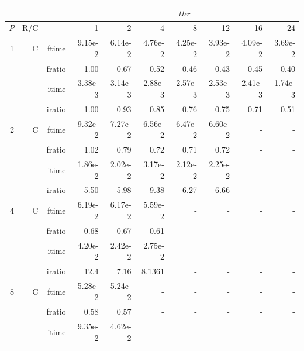 \documentclass[a4paper]{article}
\begin{document}
\begin{table}[htbp]
\begin{center}
\begin{small}
\begin{tabular}{|r|r|r|r|r|r|r|r|r|r|}
\hline 
     & & & \multicolumn{7}{c|}{$thr$} \\ \hline
    $P$ & R/C &  & 1           & 2    & 4    & 8    & 12   & 16    & 24  \\ \hline\hline

   1 &   C &   ftime &    9.15e-2 &    6.14e-2 &    4.76e-2 &    4.25e-2 &    3.93e-2 &    4.09e-2 &    3.69e-2 \\
            &            &  fratio &    1.00 &    0.67 &    0.52 &    0.46 &    0.43 &    0.45 &    0.40 \\
            &            &  itime &    3.38e-3 &    3.14e-3 &    2.88e-3 &    2.57e-3 &    2.53e-3 &    2.41e-3 &    1.74e-3 \\
            &            &  iratio &    1.00 &    0.93 &    0.85 &    0.76 &    0.75 &    0.71 &    0.51 \\\hline
   2 &   C &   ftime &    9.32e-2 &    7.27e-2 &    6.56e-2 &    6.47e-2 &    6.60e-2 &   - &   - \\
            &            &  fratio &    1.02 &    0.79 &    0.72 &    0.71 &    0.72 &   - &   - \\
            &            &  itime &    1.86e-2 &    2.02e-2 &    3.17e-2 &    2.12e-2 &    2.25e-2 &   - &   - \\
            &            &  iratio &    5.50 &    5.98 &    9.38 &    6.27 &    6.66 &   - &   - \\\hline
   4 &   C &   ftime &    6.19e-2 &    6.17e-2 &    5.59e-2 &   - &   - &   - &   - \\
            &            &  fratio &    0.68 &    0.67 &    0.61 &   - &   - &   - &   - \\
            &            &  itime &    4.20e-2 &    2.42e-2 &    2.75e-2 &   - &   - &   - &   - \\
            &            &  iratio &    12.4 &   7.16 &    8.1361 &   - &   - &   - &   - \\\hline
   8 &   C &   ftime &    5.28e-2 &    5.24e-2 &   - &   - &   - &   - &   - \\
            &            &  fratio &    0.58 &    0.57 &   - &   - &   - &   - &   - \\
            &            &  itime &    9.35e-2 &    4.62e-2 &   - &   - &   - &   - &   - \\

\end{tabular}
\end{small}
\end{center}
\end{table}
\end{document}
